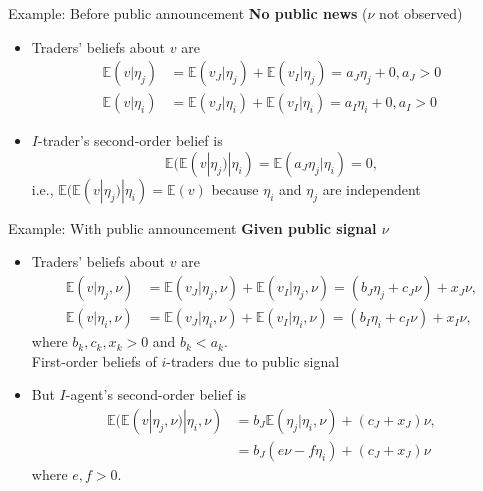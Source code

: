 \documentclass[english,10pt
,aspectratio=169
]{beamer}
\begin{document}
\begin{frame}{Example: Before public announcement}
	\textbf{No public news} ($\nu$ not observed)
	\begin{itemize}
		\item Traders' beliefs about $v$ are
		\begin{align*}
			\mathbb{E}(v|\eta_j) & =\mathbb{E}(v_{J}|\eta_j)+\mathbb{E}(v_{I}|\eta_j)=a_J \eta_j+0, a_J>0 \\
			\mathbb{E}(v|\eta_i) &=\mathbb{E}(v_{J}|\eta_i)+\mathbb{E}(v_{I}|\eta_i)=a_I \eta_i+0, a_I>0
		\end{align*}
		\item $I$-trader's second-order belief is
		\[
		\mathbb{E}(\mathbb{E}(v|\eta_j)|\eta_i)=\mathbb{E}(a_J \eta_j | \eta_i) = 0,
		\]
		i.e., $\mathbb{E}(\mathbb{E}(v|\eta_j)|\eta_i) = \mathbb{E}(v)$ because $\eta_i$ and $\eta_j$ are independent
	\end{itemize}
\end{frame}


\begin{frame}{Example: With public announcement}
	\textbf{Given public signal $\nu$}
	\begin{itemize}
		\item Traders' beliefs about $v$ are
		\begin{align*}
			\mathbb{E}(v|\eta_j, \nu) & =\mathbb{E}(v_{J}|\eta_j,\nu)+\mathbb{E}(v_{I}|\eta_j,\nu)=(b_J \eta_j+c_J\nu)+x_J \nu,  \\
			\mathbb{E}(v|\eta_i, \nu) & =\mathbb{E}(v_{J}|\eta_i,\nu)+\mathbb{E}(v_{I}|\eta_i,\nu)=(b_I \eta_i+c_I \nu)+x_I \nu,
		\end{align*}
		where $b_k,c_k,x_k>0$ and $b_k<a_k$. \\
		First-order beliefs of $i$-traders  due to public signal
		\pause
		\item But $I$-agent's second-order belief  is
		\begin{align*}
			\mathbb{E}(\mathbb{E}(v|\eta_j,\nu)|\eta_i,\nu)
			&=b_J\mathbb{E}(\eta_j|\eta_i,\nu)+(c_J+x_J)\nu, \\
			&=b_J(e\nu-f\eta_i)+(c_J+x_J)\nu 
		\end{align*}
		where $e,f>0$. 
		
	\end{itemize}
\end{frame}
\end{document}
